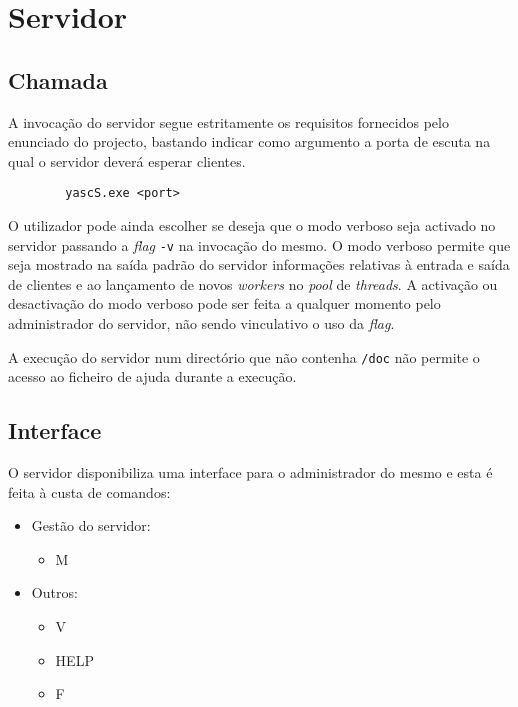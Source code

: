\section{Servidor\label{sec:Servidor}}


\subsection{Chamada\label{sec:servidor_chamada}}

	\indent\indent A invocação do servidor segue estritamente os requisitos fornecidos pelo enunciado do projecto, bastando indicar como argumento a porta de escuta na qual o servidor deverá esperar clientes.

	\begin{verbatim}
		yascS.exe <port>
	\end{verbatim}

	O utilizador pode ainda escolher se deseja que o modo verboso seja activado no servidor passando a \emph{flag} \verb|-v| na invocação do mesmo.
	O modo verboso permite que seja mostrado na saída padrão do servidor informações relativas à entrada e saída de clientes e ao lançamento de novos \emph{workers} no \emph{pool} de \emph{threads}.
	A activação ou desactivação do modo verboso pode ser feita a qualquer momento pelo administrador do servidor, não sendo vinculativo o uso da \emph{flag}.

	A execução do servidor num directório que não contenha \verb|/doc| não permite o acesso ao ficheiro de ajuda durante a execução.

\clearpage
\subsection{Interface\label{sec:servidor_interface}}

	\indent\indent O servidor disponibiliza uma interface para o administrador do mesmo e esta é feita à custa de comandos:

	\begin{itemize}
		\setlength{\parskip}{-3pt}
		\item{Gestão do servidor:}\begin{itemize}
			\setlength{\parskip}{-3pt}
			\item{M}
		\end{itemize}
		\item{Outros:}\begin{itemize}
			\setlength{\parskip}{-3pt}
			\item{V}
			\item{HELP}
			\item{F}
		\end{itemize}
	\end{itemize}

